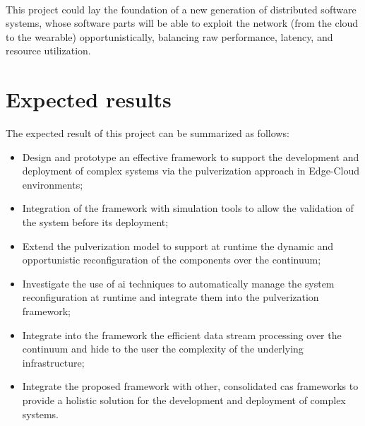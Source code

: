 \documentclass[12pt,a4paper]{article}
\begin{document}
\paragraph*{}
This project could lay the foundation of a new generation of distributed software systems,
whose software parts will be able to exploit the network (from the cloud to the wearable) opportunistically, balancing raw performance, latency, and resource utilization.


\section{Expected results}\label{sec:expected-results}

The expected result of this project can be summarized as follows:

\begin{itemize}
	\item Design and prototype an effective framework to support the development and deployment of complex systems
		via the pulverization approach in Edge-Cloud environments;
	\item Integration of the framework with simulation tools to allow the validation of the system before its deployment;
	\item Extend the pulverization model to support at runtime the dynamic and opportunistic reconfiguration of the components over the continuum;
	\item Investigate the use of \ac{ai} techniques to automatically manage the system reconfiguration at runtime and integrate them into the pulverization framework;
	\item Integrate into the framework the efficient data stream processing over the continuum and hide to the user the complexity of the underlying infrastructure;
	\item Integrate the proposed framework with other, consolidated \ac{cas} frameworks
		to provide a holistic solution for the development and deployment of complex systems.
\end{itemize}

\end{document}
